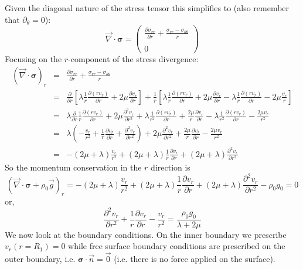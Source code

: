 Given the diagonal nature of the stress tensor this simplifies to (also remember that $\partial_\theta =0$):
\begin{equation}
{\vec \nabla}\cdot {\bm \sigma} 
=
\left(
\begin{array}{c}
\frac{\partial \sigma_{rr}}{\partial r} + \frac{\sigma_{rr}-\sigma_{\theta\theta}}{r} \\ \\
0
\end{array}
\right)
\end{equation}
Focusing on the $r$-component of the stress divergence:
\begin{eqnarray}
({\vec \nabla}\cdot {\bm \sigma})_r 
&=& 
\frac{\partial \sigma_{rr}}{\partial r} + \frac{\sigma_{rr}-\sigma_{\theta\theta}}{r} \\
&=& 
\frac{\partial }{\partial r} \left[
\lambda \frac{1}{r} \frac{\partial (r v_r)}{\partial r} + 2\mu\frac{\partial v_r}{\partial r} 
 \right] 
+ \frac{1}{r}
\left[
\lambda \frac{1}{r} \frac{\partial (r v_r)}{\partial r} + 2\mu\frac{\partial v_r}{\partial r} 
-
\lambda \frac{1}{r} \frac{\partial (r v_r)}{\partial r}  -  2 \mu\frac{v_r}{r} 
\right] \\
 &=& 
\lambda \frac{\partial }{\partial r}  \frac{1}{r} \frac{\partial (r v_r)}{\partial r} 
+ 2\mu\frac{\partial^2 v_r}{\partial r^2} 
+ 
\lambda \frac{1}{r^2} \frac{\partial (r v_r)}{\partial r} + \frac{2\mu}{r}\frac{\partial v_r}{\partial r} 
- \lambda \frac{1}{r^2} \frac{\partial (r v_r)}{\partial r}  - \frac{2 \mu v_r}{r^2} \\
&=&
\lambda ( -\frac{v_r}{r^2} + \frac{1}{r} \frac{\partial v_r}{\partial r} + \frac{\partial^2 v_r}{\partial r^2} )
+ 2\mu\frac{\partial^2 v_r}{\partial r^2} 
+ \frac{2\mu}{r}\frac{\partial v_r}{\partial r}
- \frac{2 \mu v_r}{r^2} \\ 
&=&
-(2\mu+\lambda)\frac{v_r}{r^2} 
+(2\mu+\lambda)\frac{1}{r}\frac{\partial v_r}{\partial r}  
+(2\mu+\lambda)\frac{\partial^2 v_r}{\partial r^2}  
\end{eqnarray}
So the momentum conservation in the $r$ direction is
\begin{equation}
({\vec \nabla}\cdot {\bm \sigma} + \rho_0 {\vec g})_r 
= 
-(2\mu+\lambda)\frac{v_r}{r^2} 
+(2\mu+\lambda)\frac{1}{r}\frac{\partial v_r}{\partial r}  
+(2\mu+\lambda)\frac{\partial^2 v_r}{\partial r^2} 
-\rho_0 g_0 =0
\end{equation}
or, 
\begin{equation}
\boxed{
\frac{\partial^2 v_r}{\partial r^2} 
+\frac{1}{r}\frac{\partial v_r}{\partial r}  
-\frac{v_r}{r^2} 
=\frac{\rho_0 g_0}{\lambda+2\mu}
}
\end{equation}
We now look at the boundary conditions. On the inner boundary we prescribe $v_r(r=R_1)=0$ while free
surface boundary conditions are prescribed on the outer boundary, i.e. ${\bm \sigma}\cdot{\vec n}=\vec{0}$
(i.e. there is no force applied on the surface).

